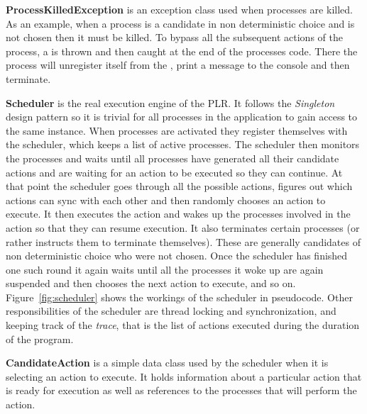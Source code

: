 	\textbf{ProcessKilledException} is an exception class used when processes
	are killed. As an example, when a process is a candidate in non deterministic
	choice and is not chosen then it must be killed. To bypass all the subsequent
	actions of the process, a  is thrown and then
	caught at the end of the processes code. There the process will unregister
	itself from the , print a message to the console and then
	terminate.
	
	\textbf{Scheduler} is the real execution engine of the PLR. It follows the
	\textit{Singleton} \cite{design_patterns} design pattern so it is trivial 
	for all	processes in the application to gain access to the same 
	 instance. When processes are activated they register 
	themselves with the scheduler, which keeps a list of active processes. The 
	scheduler then monitors the processes and waits until all processes have 
	generated all their candidate actions and are waiting for an action to be 
	executed so they can continue. At that point the scheduler goes through all 
	the possible actions, figures out which actions can sync with each other and 
	then randomly chooses an action to execute. It then executes the action and 
	wakes up the processes involved in the action so that they can resume 
	execution. It also terminates certain processes (or rather instructs them to 
	terminate themselves). These are generally candidates of non deterministic 
	choice who were not chosen. Once the scheduler has finished one such round 
	it again waits until all the processes it woke up are again suspended and 
	then chooses the next action to execute, and so on. 
	Figure~\ref{fig:scheduler} shows the workings of the scheduler in 
	pseudocode. Other responsibilities of the scheduler are thread locking and 
	synchronization, and keeping track of the \textit{trace}, that is the list 
	of actions executed during the duration of the program.
	 
	\textbf{CandidateAction} is a simple data class used by the scheduler when 
	it is selecting an action to execute. It holds information about a 
	particular action that is ready for execution as well as references to the 
	processes that will perform the action.


